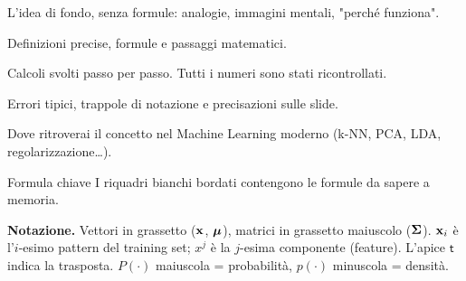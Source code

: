 \begin{intuizione}
L'idea di fondo, senza formule: analogie, immagini mentali, "perché funziona".
\end{intuizione}
\begin{tecnica}
Definizioni precise, formule e passaggi matematici.
\end{tecnica}
\begin{esempio}
Calcoli svolti passo per passo. Tutti i numeri sono stati ricontrollati.
\end{esempio}
\begin{attenzione}
Errori tipici, trappole di notazione e precisazioni sulle slide.
\end{attenzione}
\begin{mlbox}
Dove ritroverai il concetto nel Machine Learning moderno (k-NN, PCA, LDA, regolarizzazione\dots).
\end{mlbox}
\begin{formulat}{Formula chiave}
I riquadri bianchi bordati contengono le formule da sapere a memoria.
\end{formulat}

\vspace{4pt}
{\headfont\bfseries\color{navy}Notazione.}\;
Vettori in grassetto ($\mathbf{x}$, $\bm{\mu}$), matrici in grassetto maiuscolo ($\bm{\Sigma}$). $\mathbf{x}_i$ è l'$i$-esimo pattern del training set; $x^j$ è la $j$-esima componente (feature). L'apice $\mathsf{t}$ indica la trasposta. $P(\cdot)$ maiuscola = probabilità, $p(\cdot)$ minuscola = densità.

\clearpage
\thispagestyle{plain}
\tableofcontents
